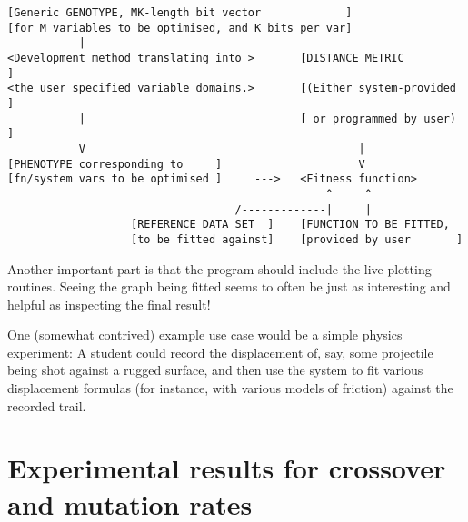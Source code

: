 \documentclass[a4paper,9pt]{article}
\newcommand{\tightit}{\vspace{-5pt}}
\begin{document}
{ \scriptsize
\begin{verbatim}
[Generic GENOTYPE, MK-length bit vector             ]
[for M variables to be optimised, and K bits per var]
           |
<Development method translating into >       [DISTANCE METRIC         ]
<the user specified variable domains.>       [(Either system-provided ]
           |                                 [ or programmed by user) ]
           V                                          |
[PHENOTYPE corresponding to     ]                     V
[fn/system vars to be optimised ]     --->   <Fitness function>
                                                 ^     ^
                                   /-------------|     |
                   [REFERENCE DATA SET  ]    [FUNCTION TO BE FITTED,
                   [to be fitted against]    [provided by user       ]
\end{verbatim}
}
Another important part is that the program should include the live plotting
routines. Seeing the graph being fitted seems to often be just as interesting
and helpful as inspecting the final result!

One (somewhat contrived) example use case would be a simple physics
experiment: A student could record the displacement of, say, some projectile
being shot against a rugged surface, and then use the system to fit various
displacement formulas (for instance, with various models of friction) against
the recorded trail. 

   



\appendix
\tightit \label{app:ratetest}

\section{Experimental results for crossover and mutation rates}


\end{document}
